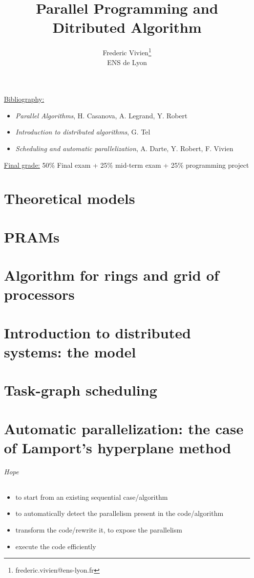 \documentclass{article}
\title{Parallel Programming and Ditributed Algorithm}
\author{Frederic Vivien\footnote{frederic.vivien@ens-lyon.fr}\\
\small ENS de Lyon}
\date{}
\newcommand{\note}{\medskip\noindent\underline}
\begin{document}
\maketitle
\tableofcontents
\newpage


\note{Bibliography:}
\begin{itemize}
\item \textit{Parallel Algorithms}, H. Casanova, A. Legrand, Y. Robert
\item \textit{Introduction to distributed algorithms}, G. Tel
\item \textit{Scheduling and automatic parallelization}, A. Darte, Y. Robert, F. Vivien
\end{itemize}


\note{Final grade:} 50\% Final exam + 25\% mid-term exam + 25\% programming project

\part{Theoretical models}


\newpage
\setcounter{section}{0}
\part{PRAMs}


\newpage
\setcounter{section}{0}
\part{Algorithm for rings and grid of processors}


\setcounter{section}{0}
\part{Introduction to distributed systems: the model}


\setcounter{section}{0}
\part{Task-graph scheduling}



\setcounter{section}{0}
\part{Automatic parallelization: the case of Lamport's hyperplane method}

\paragraph{Hope}
\begin{itemize}
\item to start from an existing sequential case/algorithm
\item to automatically detect the parallelism present in the code/algorithm
\item transform the code/rewrite it, to expose the parallelism
\item execute the code efficiently
\end{itemize}
\end{document}
